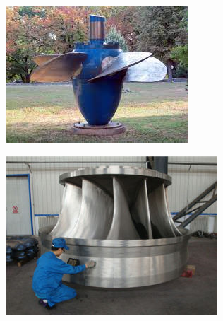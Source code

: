 \documentclass[12pt]{report}
\begin{document}
\begin{figure}[b]
     \centering
     \begin{subfigure}[b]{0.3\textwidth}
         \centering
         \includegraphics[width=\textwidth]{kaplan}
				 \caption{{}}
         \label{fig:kaplan}
     \end{subfigure}
     \hfill
     \begin{subfigure}[b]{0.3\textwidth}
         \centering
         \includegraphics[width=\textwidth]{francis}
         \caption{{}}
         \label{fig:francis}
     \end{subfigure}
     \hfill
     \begin{subfigure}[b]{0.3\textwidth}

\end{subfigure}
\end{figure}
\end{document}
